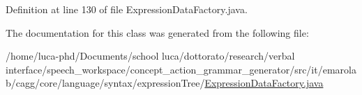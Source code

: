 Definition at line 130 of file Expression\-Data\-Factory.\-java.



The documentation for this class was generated from the following file\-:\begin{DoxyCompactItemize}
\item 
/home/luca-\/phd/\-Documents/school luca/dottorato/research/verbal interface/speech\-\_\-workspace/concept\-\_\-action\-\_\-grammar\-\_\-generator/src/it/emarolab/cagg/core/language/syntax/expression\-Tree/\hyperlink{ExpressionDataFactory_8java}{Expression\-Data\-Factory.\-java}\end{DoxyCompactItemize}
